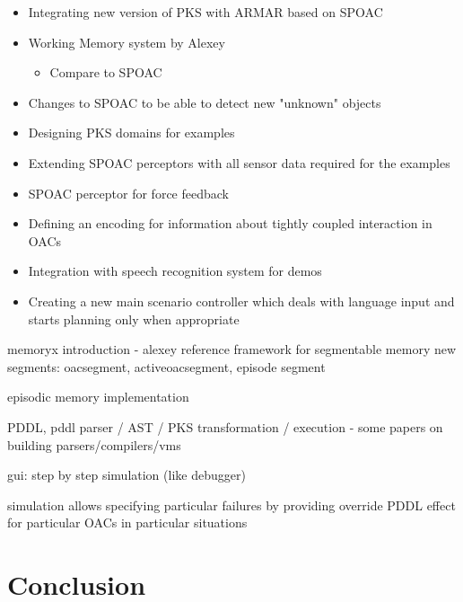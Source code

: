 \documentclass[english,ngerman]{KITreprt}
\begin{document}
\begin{itemize}
    \item Integrating new version of PKS with ARMAR based on SPOAC
    \item Working Memory system by Alexey
        \begin{itemize}
            \item Compare to SPOAC
        \end{itemize}
    \item Changes to SPOAC to be able to detect new "unknown" objects
    \item Designing PKS domains for examples
    \item Extending SPOAC perceptors with all sensor data required for the examples
    \item SPOAC perceptor for force feedback
    \item Defining an encoding for information about tightly coupled interaction in OACs
    \item Integration with speech recognition system for demos
    \item Creating a new main scenario controller which deals with language input and
        starts planning only when appropriate
\end{itemize}

memoryx introduction - alexey reference
framework for segmentable memory
new segments: oacsegment, activeoacsegment, episode segment

episodic memory implementation

PDDL, pddl parser / AST / PKS transformation / execution - some papers on building parsers/compilers/vms

gui: step by step simulation (like debugger)

simulation allows specifying particular failures by providing override PDDL effect for particular OACs in particular situations

\chapter{Conclusion}





\end{document}
